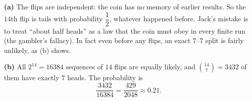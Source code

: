 \textbf{(a)} The flips are independent: the coin has no memory of earlier results. So the $14$th flip is tails with probability $\boxed{\dfrac12}$, whatever happened before. Jack's mistake is to treat ``about half heads'' as a law that the coin must obey in every finite run (the gambler's fallacy). In fact even before any flips, an exact $7$--$7$ split is fairly unlikely, as (b) shows.

\textbf{(b)} All $2^{14}=16384$ sequences of $14$ flips are equally likely, and $\binom{14}{7}=3432$ of them have exactly $7$ heads. The probability is
\[\dfrac{3432}{16384}=\boxed{\dfrac{429}{2048}}\approx0.21.\]
